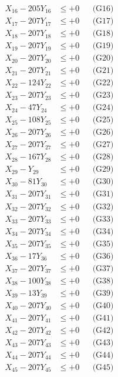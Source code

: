 \documentclass[a4paper,10pt]{article}
\begin{document}
{\begin{align}
X_{16} - 205Y_{16} &\leq +0 && \text{(G16)} \\
X_{17} - 207Y_{17} &\leq +0 && \text{(G17)} \\
X_{18} - 207Y_{18} &\leq +0 && \text{(G18)} \\
X_{19} - 207Y_{19} &\leq +0 && \text{(G19)} \\
X_{20} - 207Y_{20} &\leq +0 && \text{(G20)} \\
\allowbreak
X_{21} - 207Y_{21} &\leq +0 && \text{(G21)} \\
X_{22} - 124Y_{22} &\leq +0 && \text{(G22)} \\
X_{23} - 207Y_{23} &\leq +0 && \text{(G23)} \\
X_{24} - 47Y_{24} &\leq +0 && \text{(G24)} \\
X_{25} - 108Y_{25} &\leq +0 && \text{(G25)} \\
X_{26} - 207Y_{26} &\leq +0 && \text{(G26)} \\
X_{27} - 207Y_{27} &\leq +0 && \text{(G27)} \\
X_{28} - 167Y_{28} &\leq +0 && \text{(G28)} \\
X_{29} - Y_{29} &\leq +0 && \text{(G29)} \\
X_{30} - 81Y_{30} &\leq +0 && \text{(G30)} \\
\allowbreak
X_{31} - 207Y_{31} &\leq +0 && \text{(G31)} \\
X_{32} - 207Y_{32} &\leq +0 && \text{(G32)} \\
X_{33} - 207Y_{33} &\leq +0 && \text{(G33)} \\
X_{34} - 207Y_{34} &\leq +0 && \text{(G34)} \\
X_{35} - 207Y_{35} &\leq +0 && \text{(G35)} \\
X_{36} - 17Y_{36} &\leq +0 && \text{(G36)} \\
X_{37} - 207Y_{37} &\leq +0 && \text{(G37)} \\
X_{38} - 100Y_{38} &\leq +0 && \text{(G38)} \\
X_{39} - 13Y_{39} &\leq +0 && \text{(G39)} \\
X_{40} - 207Y_{40} &\leq +0 && \text{(G40)} \\
\allowbreak
X_{41} - 207Y_{41} &\leq +0 && \text{(G41)} \\
X_{42} - 207Y_{42} &\leq +0 && \text{(G42)} \\
X_{43} - 207Y_{43} &\leq +0 && \text{(G43)} \\
X_{44} - 207Y_{44} &\leq +0 && \text{(G44)} \\
X_{45} - 207Y_{45} &\leq +0 && \text{(G45)} \\

\end{align}}
\end{document}
